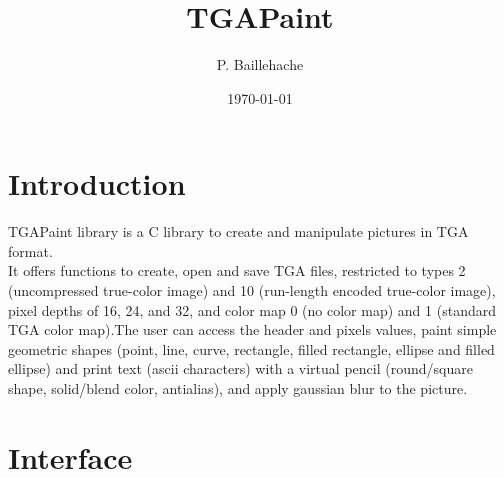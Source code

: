 \documentclass[12pt, a4paper]{article}
\begin{document}
\title{TGAPaint}
\author{P. Baillehache}
\date{\today}
\maketitle

\tableofcontents

\section*{Introduction}

TGAPaint library is a C library to create and manipulate pictures in TGA format.\\

It offers functions to create, open and save TGA files, restricted to types 2 (uncompressed true-color image) and 10 (run-length encoded true-color image), pixel depths of 16, 24, and 32, and color map 0 (no color map) and 1 (standard TGA color map).The user can access the header and pixels values, paint simple geometric shapes (point, line, curve, rectangle, filled rectangle, ellipse and filled ellipse) and print text (ascii characters) with a virtual pencil (round/square shape, solid/blend color, antialias), and apply gaussian blur to the picture.\\ 

\section{Interface}
\end{document}
